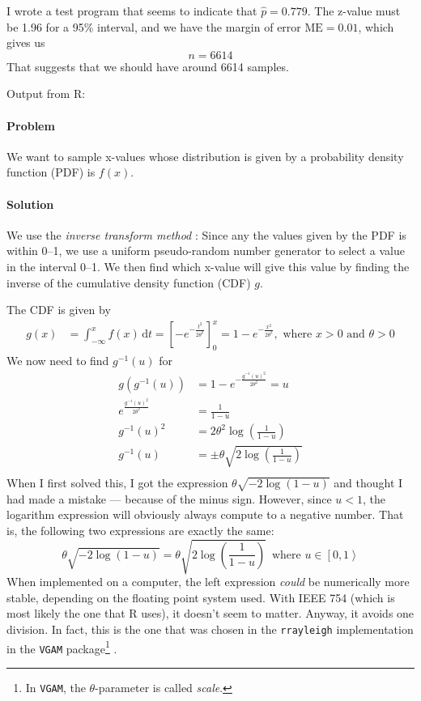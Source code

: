 \documentclass[a4paper,english,12pt]{article}
\begin{document}
I wrote a test program that seems to indicate that $\hat{p} = 0.779$. The
z-value must be 1.96 for a 95\%{} interval, and we have the margin of error
$\text{ME} = 0.01$, which gives us
\[
  n = 6614
\]
That suggests that we should have around 6614 samples.

Output from R:

\paragraph{Problem} We want to sample x-values whose distribution is given by a
probability density function (PDF) is $f(x)$.

\paragraph{Solution} We use the \textit{inverse transform method}
\cite{wiki:inverse.transform.method}: Since any the values given by the PDF is
within 0--1, we use a uniform pseudo-random number generator to select a value
in the interval 0--1. We then find which x-value will give this value by
finding the inverse of the cumulative density function (CDF) $g$.

The CDF is given by
\begin{align*}
  g(x) & = \int_{-\infty}^{x} f(x)\, \mathrm{d}t 
     = \left[ -e^{-\frac{t^2}{2\theta^2}} \right]_0^{x} = 
     1 - e^{-\frac{x^2}{2\theta^2}}, \text{ where } x>0 \text{ and } \theta > 0
\end{align*}
We now need to find $g^{-1}(u)$ for
\begin{align*}
  g(g^{-1}(u)) &= 1 - e^{-\frac{g^{-1}(u)^2}{2\theta^2}} = u \\
   e^\frac{g^{-1}(u)^2}{2\theta^2}  &= \frac{1}{1 - u} \\
   g^{-1}(u)^2  &= 2\theta^2\log{\left(\frac{1}{1 - u}\right)} \\
   g^{-1}(u)  &= \pm\theta\sqrt{2\log{\left(\frac{1}{1 - u}\right)}} \\
\end{align*}
When I first solved this, I got the expression $\theta\sqrt{-2\log{(1-u)}}$ and
thought I had made a mistake --- because of the minus sign. However, since
$u<1$, the logarithm expression will obviously always compute to a negative
number. That is, the following two expressions are exactly the same:
\[
  \theta\sqrt{-2\log{(1-u)}} = \theta\sqrt{2\log{\left(\frac{1}{1-u}\right)}}\,
  \text{ where } u \in \left[0,1\right>
\]
When implemented on a computer, the left expression \textit{could} be
numerically more stable, depending on the floating point system used. With IEEE
754 (which is most likely the one that R uses), it doesn't seem to matter.
Anyway, it avoids one division. In fact, this is the one that was chosen in the
\texttt{rrayleigh} implementation in the \texttt{VGAM} package\footnote{In
\texttt{VGAM}, the $\theta$-parameter is called \textit{scale}.}
\cite{github:vgam}.
\end{document}
